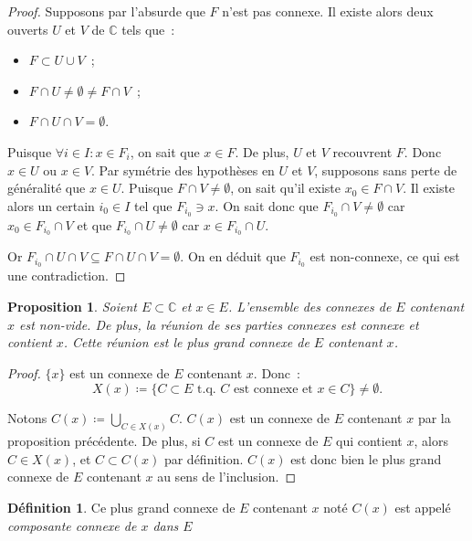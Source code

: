 \documentclass{report}
\newtheorem{prp}[thm]{Proposition}
\theoremstyle{definition}
\newtheorem{déf}[thm]{Définition}
\theoremstyle{remark}
\numberwithin{equation}{section}
\newcommand{\C}{\mathbb C}
\newcommand{\tq}{\text{ t.q. }}
\begin{document}
			\begin{proof} Supposons par l'absurde que $F$ n'est pas connexe. Il existe alors deux ouverts $U$ et $V$ de $\C$ tels que~:
			\begin{itemize}
				\item $F \subset U \cup V$~;
				\item $F \cap U \neq \emptyset \neq F \cap V$~;
				\item $F \cap U \cap V = \emptyset$.
			\end{itemize}

			Puisque $\forall i \in I : x \in F_i$, on sait que $x \in F$. De plus, $U$ et $V$ recouvrent $F$. Donc $x \in U$ ou $x \in V$. Par symétrie des hypothèses
			en $U$ et $V$, supposons sans perte de généralité que $x \in U$. Puisque $F \cap V \neq \emptyset$, on sait qu'il existe $x_0 \in F \cap V$. Il existe
			alors un certain $i_0 \in I$ tel que $F_{i_0} \ni x$. On sait donc que $F_{i_0} \cap V \neq \emptyset$ car $x_0 \in F_{i_0} \cap V$ et que
			$F_{i_0} \cap U \neq \emptyset$ car $x \in F_{i_0} \cap U$.

			Or $F_{i_0} \cap U \cap V \subseteq F \cap U \cap V = \emptyset$. On en déduit que $F_{i_0}$ est non-connexe, ce qui est une contradiction.
			\end{proof}

			\begin{prp} Soient $E \subset \C$ et $x \in E$. L'ensemble des connexes de $E$ contenant $x$ est non-vide. De plus, la réunion de ses parties connexes
			est connexe et contient $x$. Cette réunion est le plus grand connexe de $E$ contenant $x$.
			\end{prp}

			\begin{proof} $\{x\}$ est un connexe de $E$ contenant $x$. Donc~:
			\begin{equation}
				X(x) \coloneqq \{C \subset E \tq C \text{ est connexe et } x \in C\} \neq \emptyset.
			\end{equation}

			Notons $C(x) \coloneqq \bigcup_{C \in X(x)}C$. $C(x)$ est un connexe de $E$ contenant $x$ par la proposition précédente. De plus, si $C$ est un connexe de
			$E$ qui contient $x$, alors $C \in X(x)$, et $C \subset C(x)$ par définition. $C(x)$ est donc bien le plus grand connexe de $E$ contenant $x$ au sens de
			l'inclusion.
			\end{proof}

			\begin{déf} Ce plus grand connexe de $E$ contenant $x$ noté $C(x)$ est appelé \textit{composante connexe de $x$ dans $E$}
			\end{déf}
\end{document}
